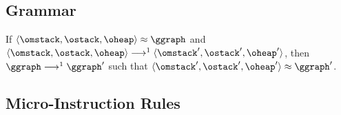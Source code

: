 \documentclass{article}
\begin{document}
      \subsection{Grammar}

      \begin{grammar}
        \grule[graph]{\ggraph}{ \{\gedge, \ldots\} }
        \grule[edges]{\gedge}{
                    \gnode \gsBefore \gnode
            \gor    \gnode \gsSkip \gnode
        }
        \grule[nodes]{\gnode}{
                    \gsstart
            \gor    \gsend
            \gor    \gsLR{\olbl, \omstack, \gtime}
            \gor    \gsLR{\genter \olbl, \gtime}
            \gor    \gsLR{\gleave \olbl, \gtime}
        }

      \end{grammar}

      \begin{theorem}[Bisimulation]
        If $\osLR{\omstack, \ostack, \oheap} \approx \ggraph$ and $\osLR{\omstack, \ostack, \oheap} \osTransition \osLR{\omstack', \ostack', \oheap'}$, then $\ggraph \gsTransition \ggraph'$ such that $\osLR{\omstack', \ostack', \oheap'} \approx \ggraph'$.
      \end{theorem}

      \subsection{Micro-Instruction Rules}

      \begin{mathpar}
      \end{mathpar}

      \begin{mathpar}
      \end{mathpar}
\end{document}

